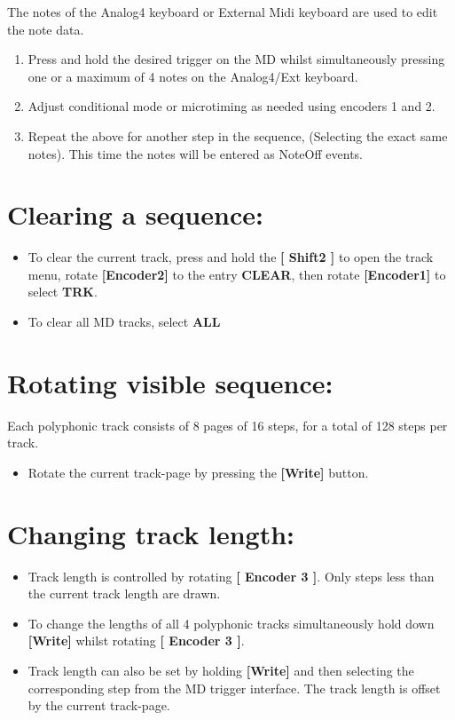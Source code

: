 The notes of the Analog4 keyboard or External Midi keyboard are used to edit the note data.

\begin{enumerate}
\item Press and hold the desired trigger on the MD whilst simultaneously pressing one or a maximum of 4 notes on the Analog4/Ext keyboard.
\item Adjust conditional mode or microtiming as needed using encoders 1 and 2.
\item Repeat the above for another step in the sequence, (Selecting the exact same notes). This time the notes will be entered as NoteOff events.
\end{enumerate}

\section{Clearing a sequence:}
\begin{itemize}
\item To clear the current track, press and hold the\textbf{ [ Shift2 ]} to open the track menu, rotate \textbf{[Encoder2]} to the entry \textbf{CLEAR}, then rotate \textbf{[Encoder1]} to select \textbf{TRK}.
\item To clear all MD tracks, select \textbf{ALL}
\end{itemize}

\vspace{-0.3cm}

\section{Rotating visible sequence:}
Each polyphonic track consists of 8 pages of 16 steps, for a total of 128 steps per track.
\begin{itemize}
\item Rotate the current track-page by pressing the \textbf{[Write] }button.
\end{itemize}

\vspace{-0.3cm}

\section{Changing track length:}
\begin{itemize}
\item Track length is controlled by rotating \textbf{[ Encoder 3 ]}. Only steps less than the current track length are drawn.
\item To change the lengths of all 4 polyphonic tracks simultaneously hold down \textbf{[Write]} whilst rotating \textbf{[ Encoder 3 ]}.
\item Track length can also be set by holding \textbf{[Write]} and then selecting the corresponding step from the MD trigger interface. The track length is offset by the current track-page.
\end{itemize}


